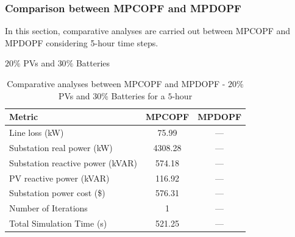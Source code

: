 \documentclass[../../outputs/main.tex]{subfiles}
\begin{document}
\subsubsection{Comparison between MPCOPF and MPDOPF}
In this section, comparative analyses are carried out between MPCOPF and MPDOPF considering 5-hour time steps.



$20 \%$ PVs and $30 \%$ Batteries

\begin{table}[h!]
    \centering
    \caption{Comparative analyses between MPCOPF and MPDOPF - $20 \%$ PVs and $30 \%$ Batteries for a $5$-hour}
    \begin{tabular}{|l|c|c|}
    \hline
    \textbf{Metric} & \textbf{MPCOPF} & \textbf{MPDOPF} \\ \hline
    Line loss (kW) & 75.99 & --- \\ \hline
    Substation real power (kW) & 4308.28 & --- \\ \hline
    Substation reactive power (kVAR) & 574.18 & --- \\ \hline
    PV reactive power (kVAR) & 116.92 & --- \\ \hline
    Substation power cost (\$) & 576.31 & --- \\ \hline
    Number of Iterations & 1 & --- \\ \hline
    Total Simulation Time (s) & 521.25 & --- \\ \hline
    \end{tabular}
    \label{table:opt-5-20-30}
\end{table}
\end{document}
